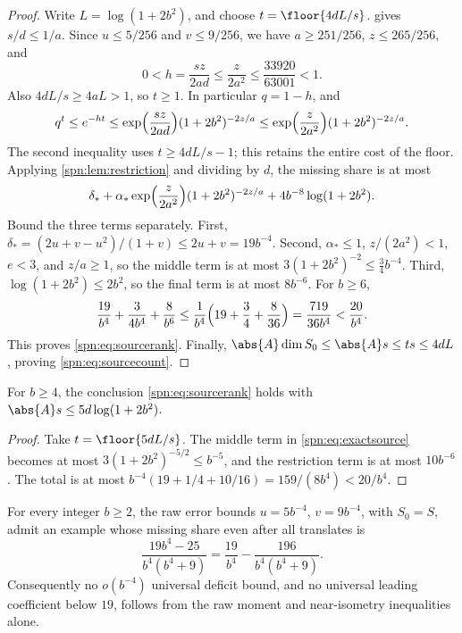 \begin{proof}
Write $L=\log(1+2b^2)$, and choose $t=\floor{4dL/s}$.  gives
$s/d\le1/a$. Since $u\le5/256$ and $v\le9/256$, we have $a\ge251/256$,
$z\le265/256$, and
\[
 0<h=\frac{sz}{2ad}\le\frac{z}{2a^2}\le\frac{33920}{63001}<1 .
\]
Also $4dL/s\ge4aL>1$, so $t\ge1$. In particular $q=1-h$, and
\[
 q^t\le e^{-ht}\le\exp\Bigl(\frac{sz}{2ad}\Bigr)(1+2b^2)^{-2z/a}
 \le\exp\Bigl(\frac{z}{2a^2}\Bigr)(1+2b^2)^{-2z/a}.
\]
The second inequality uses $t\ge4dL/s-1$; this retains the entire cost of the
floor. Applying \cref{spn:lem:restriction} and dividing by $d$, the missing
share is at most
\begin{equation}\label{spn:eq:exactsource}
 \delta_*+\alpha_*\exp\Bigl(\frac{z}{2a^2}\Bigr)(1+2b^2)^{-2z/a}
 +4b^{-8}\log(1+2b^2).
\end{equation}
Bound the three terms separately. First,
$\delta_*=(2u+v-u^2)/(1+v)\le2u+v=19b^{-4}$. Second, $\alpha_*\le1$,
$z/(2a^2)<1$, $e<3$, and $z/a\ge1$, so the middle term is at most
$3(1+2b^2)^{-2}\le\tfrac34b^{-4}$. Third, $\log(1+2b^2)\le2b^2$, so the final
term is at most $8b^{-6}$. For $b\ge6$,
\[
 \frac{19}{b^4}+\frac3{4b^4}+\frac8{b^6}
 \le\frac1{b^4}\Bigl(19+\frac34+\frac8{36}\Bigr)=\frac{719}{36b^4}
 <\frac{20}{b^4}.
\]
This proves \eqref{spn:eq:sourcerank}. Finally,
$\abs{A}\dim S_0\le\abs{A}s\le ts\le4dL$, proving \eqref{spn:eq:sourcecount}.
\end{proof}

\begin{corollary}\label{spn:cor:five}
For $b\ge4$, the conclusion \eqref{spn:eq:sourcerank} holds with
$\abs{A}s\le5d\log(1+2b^2)$.
\end{corollary}

\begin{proof}
Take $t=\floor{5dL/s}$. The middle term in \eqref{spn:eq:exactsource} becomes
at most $3(1+2b^2)^{-5/2}\le b^{-5}$, and the restriction term is at most
$10b^{-6}$. The total is at most
$b^{-4}(19+1/4+10/16)=159/(8b^4)<20/b^4$.
\end{proof}

\begin{proposition}\label{spn:prop:fourth}
For every integer $b\ge2$, the raw error bounds $u=5b^{-4}$, $v=9b^{-4}$, with
$S_0=S$, admit an example whose missing share even after all translates is
\[
 \frac{19b^4-25}{b^4(b^4+9)}=\frac{19}{b^4}-\frac{196}{b^4(b^4+9)}.
\]
Consequently no $o(b^{-4})$ universal deficit bound, and no universal leading
coefficient below $19$, follows from the raw moment and near-isometry
inequalities alone.
\end{proposition}

